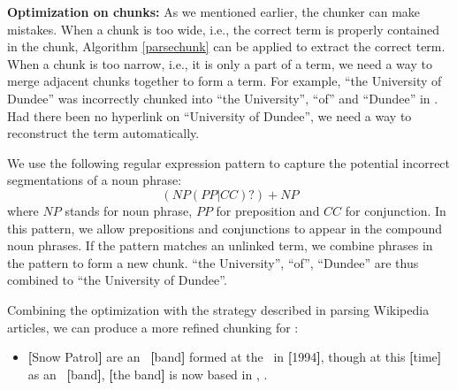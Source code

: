 \textbf{Optimization on chunks:}
As we mentioned earlier, the chunker can make mistakes. When a chunk
is too wide, i.e., the correct term is properly contained in the chunk,
Algorithm \ref{parsechunk}  can be applied to extract the correct term.
When a chunk is too narrow, i.e., it is only a part of a term, we need
a way to merge adjacent chunks together to form a term.
For example, ``the University of Dundee'' was incorrectly
chunked into ``the University'',
``of'' and ``Dundee'' in . Had there been no hyperlink
on ``University of Dundee'', we need a way to reconstruct the term
automatically.

We use the following regular expression pattern to capture the potential
incorrect segmentations of a noun phrase:
\[(NP(PP|CC)?)+NP\]
where $NP$ stands for noun phrase, $PP$ for preposition and $CC$ for conjunction.
In this pattern, we allow prepositions and conjunctions to appear in
the compound noun phrases.  If the pattern matches an unlinked term,
we combine phrases in the pattern to form a new chunk.
``the University'', ``of'', ``Dundee'' are thus combined to
``the University of Dundee''.

Combining the optimization with the strategy described in parsing Wikipedia articles,
we can produce a more refined chunking for :
\begin{itemize}
\item {\textbf{[}Snow Patrol\textbf{]}} are an
\rbb\ {\textbf{[}band\textbf{]}} formed at the \rbb\ in
{\textbf{[}1994\textbf{]}}, though at this {\textbf{[}time\textbf{]}} as an
\rbb\ {\textbf{[}band\textbf{]}}, {\textbf{[}the band\textbf{]}} is now based in \rbb,
\rbb.
\end{itemize}

